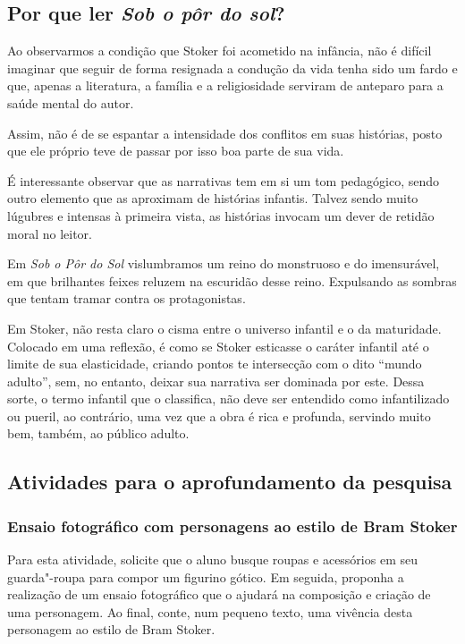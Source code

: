 \documentclass[12pt]{extarticle}
\begin{document}
\subsection{Por que ler \textit{Sob o pôr do sol}?}

Ao observarmos a condição que Stoker foi acometido na infância, não é
difícil imaginar que seguir de forma resignada a condução da vida tenha
sido um fardo e que, apenas a literatura, a família e a religiosidade
serviram de anteparo para a saúde mental do autor.

Assim, não é de se espantar a intensidade dos conflitos em suas
histórias, posto que ele próprio teve de passar por isso boa parte de
sua vida.

É interessante observar que as narrativas tem em si um tom pedagógico,
sendo outro elemento que as aproximam de histórias infantis. Talvez
sendo muito lúgubres e intensas à primeira vista, as histórias invocam
um dever de retidão moral no leitor.

Em \emph{Sob o Pôr do Sol} vislumbramos um reino do monstruoso e do
imensurável, em que brilhantes feixes reluzem na escuridão desse reino.
Expulsando as sombras que tentam tramar contra os protagonistas.

Em Stoker, não resta claro o cisma entre o universo infantil e o da
maturidade. Colocado em uma reflexão, é como se Stoker esticasse o
caráter infantil até o limite de sua elasticidade, criando pontos te
intersecção com o dito ``mundo adulto'', sem, no entanto, deixar sua
narrativa ser dominada por este. Dessa sorte, o termo infantil que o
classifica, não deve ser entendido como infantilizado ou pueril, ao
contrário, uma vez que a obra é rica e profunda, servindo muito bem,
também, ao público adulto.

\subsection{Atividades para o aprofundamento da pesquisa}

\subsubsection{Ensaio fotográfico com personagens ao estilo de Bram Stoker}

Para esta atividade, solicite que o aluno busque roupas e acessórios
em seu guarda"-roupa para compor um figurino gótico. Em seguida,
proponha a realização de um ensaio fotográfico que o ajudará na
composição e criação de uma personagem. Ao final, conte, num pequeno
texto, uma vivência desta personagem ao estilo de Bram Stoker.
\end{document}
